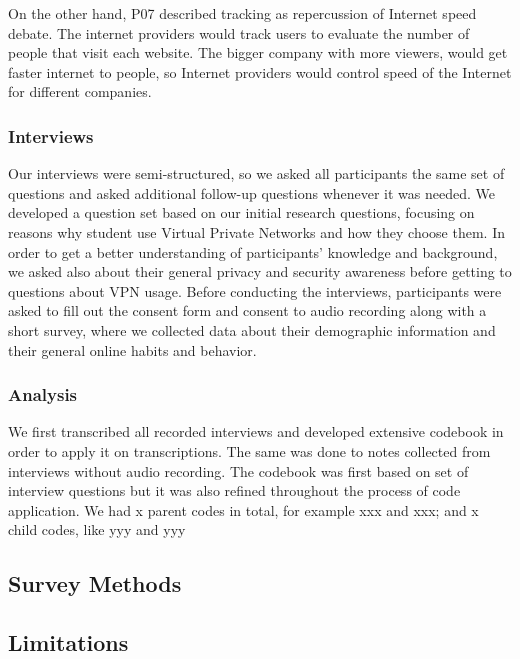 On the other hand, P07 described tracking as repercussion of Internet speed debate. The internet providers would track users to evaluate the number of people that visit each website. The bigger company with more viewers, would get faster internet to people, so Internet providers would control speed of the Internet for different companies. 



\subsubsection{Interviews}
Our interviews were semi-structured, so we asked all participants the same set of questions and asked additional follow-up questions whenever it was needed. We developed a question set based on our initial research questions, focusing on reasons why student use Virtual Private Networks and how they choose them. In order to get a better understanding of participants’ knowledge and background, we asked also about their general privacy and security awareness before getting to questions about VPN usage. 
Before conducting the interviews, participants were asked to fill out the consent form and consent to audio recording along with a short survey, where we collected data about their demographic information and their general online habits and behavior. 

\subsubsection{Analysis}
We first transcribed all recorded interviews and developed extensive codebook in order to apply it on transcriptions. The same was done to notes collected from interviews without audio recording. The codebook was first based on set of interview questions but it was also refined throughout the process of code application. We had x parent codes in total, for example xxx and xxx; and x child codes, like yyy and yyy

\subsection{Survey Methods}

\subsection{Limitations}